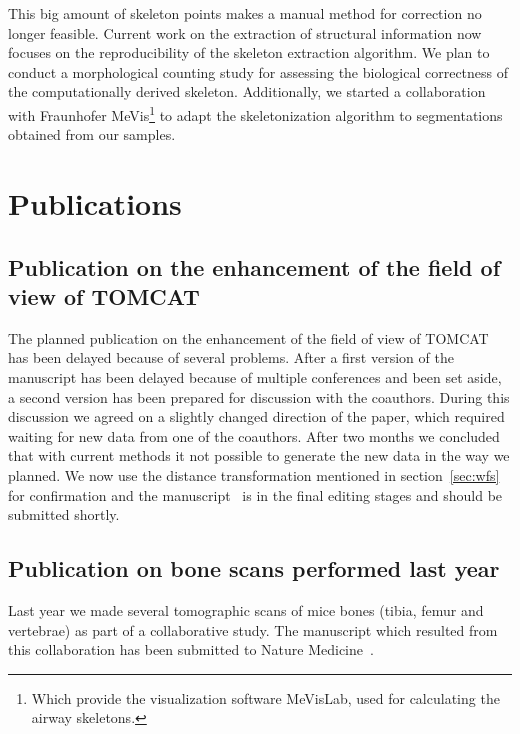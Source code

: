 \documentclass[a4paper,twoside,DIV=calc]{scrartcl}
\begin{document}
This big amount of skeleton points makes a manual method for correction no longer feasible. Current work on the extraction of structural information now focuses on the reproducibility of the skeleton extraction algorithm. We plan to conduct a morphological counting study for assessing the biological correctness of the computationally derived skeleton. Additionally, we started a collaboration with Fraunhofer MeVis\footnote{Which provide the visualization software MeVisLab, used for calculating the airway skeletons.} to adapt the skeletonization algorithm to segmentations obtained from our samples.

\section{Publications}\label{sec:publications}
\subsection{Publication on the enhancement of the field of view of TOMCAT}
The planned publication on the enhancement of the field of view of TOMCAT has been delayed because of several problems. After a first version of the manuscript has been delayed because of multiple conferences and been set aside, a second version has been prepared for discussion with the coauthors. During this discussion we agreed on a slightly changed direction of the paper, which required waiting for new data from one of the coauthors. After two months we concluded that with current methods it not possible to generate the new data in the way we planned. We now use the distance transformation mentioned in section~\ref{sec:wfs} for confirmation and the manuscript~\cite{Haberthuer2010} is in the final editing stages and should be submitted shortly.

\subsection{Publication on bone scans performed last year}
Last year we made several tomographic scans of mice bones (tibia, femur and vertebrae) as part of a collaborative study. The manuscript which resulted from this collaboration has been submitted to Nature Medicine~\cite{Sausbier2009b}.



\end{document}
